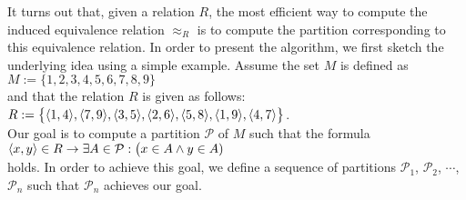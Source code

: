 It turns out that, given a relation $R$, the most efficient way to compute the induced equivalence
relation $\approx_R$ is to compute the partition corresponding to this equivalence relation.  In
order to present the algorithm, we first sketch the underlying idea using a simple example.  Assume
the set $M$ is defined as
\\
\hspace*{1.3cm}
$M := \{ 1,2,3,4,5,6,7,8,9 \}$
\\[0.2cm]
and that the relation $R$ is given as follows:
\\[0.2cm]
\hspace*{1.3cm}
$R := \bigl\{ \pair(1,4), \pair(7,9), \pair(3,5), \pair(2,6), \pair(5,8), \pair(1,9), \pair(4,7) \bigr\}$.
\\[0.2cm]
Our goal is to compute a partition $\mathcal{P}$ of $M$ such that the formula
\\[0.2cm]
\hspace*{1.3cm}
$\pair(x, y) \in R \rightarrow \exists A \in \mathcal{P}:\bigl(x \in A \wedge y \in A)$
\\[0.2cm]
holds.  In order to achieve this goal, we define a sequence of partitions $\mathcal{P}_1$,
$\mathcal{P}_2$, $\cdots$, $\mathcal{P}_n$ such that $\mathcal{P}_n$ achieves our goal.
